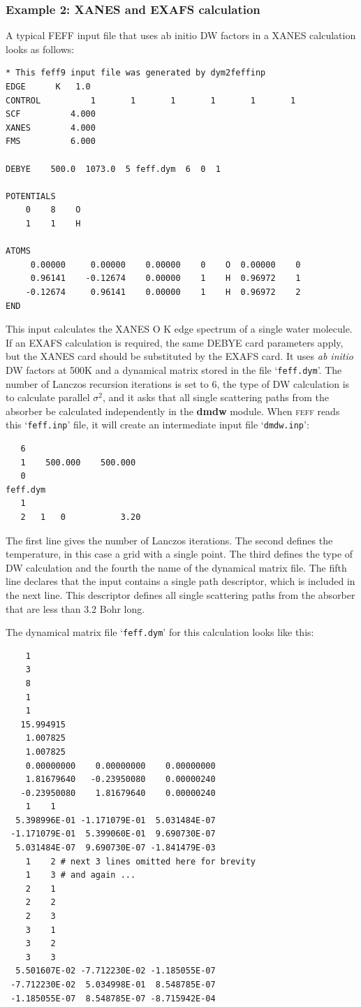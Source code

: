 \documentclass[11pt,oneside]{report} %
\newcommand{\program}[1]{\textsc{#1}}
\newcommand{\feff}{\program{feff}}
\newcommand{\file}[1]{`\texttt{#1}'}
\newcommand{\module}[1]{\textrm{\bf{#1}}}
\begin{document}
 
 \subsubsection{Example 2: XANES and EXAFS calculation}
 
  A typical FEFF input file that uses ab initio DW factors in a XANES
  calculation looks as follows:
  \begin{verbatim}
* This feff9 input file was generated by dym2feffinp
EDGE      K   1.0
CONTROL          1       1       1       1       1       1
SCF          4.000
XANES        4.000
FMS          6.000

DEBYE    500.0  1073.0  5 feff.dym  6  0  1

POTENTIALS
    0    8    O
    1    1    H

ATOMS
     0.00000     0.00000    0.00000    0    O  0.00000    0
     0.96141    -0.12674    0.00000    1    H  0.96972    1
    -0.12674     0.96141    0.00000    1    H  0.96972    2
END
\end{verbatim}

  This input calculates the XANES O K edge spectrum of a single water
  molecule. If an EXAFS calculation is required, the same DEBYE card parameters
  apply, but the XANES card should be substituted by the EXAFS card. It uses {\it ab
  initio} DW factors at 500K and a dynamical matrix stored in the file
  \file{feff.dym}. The number of Lanczos recursion iterations is set to 6, the type
  of DW calculation is to calculate parallel $\sigma^2$, and it asks that all single
  scattering paths from the absorber be calculated independently in the \module{dmdw}
  module.  When {\feff} reads this \file{feff.inp} file, it will create an intermediate input file \file{dmdw.inp}:
\begin{verbatim}
   6
   1    500.000    500.000
   0
feff.dym
   1
   2   1   0           3.20
\end{verbatim}  
  The first line gives the number of Lanczos iterations. The second
  defines the temperature, in this case a grid with a single point. The third
  defines the type of DW calculation and the fourth the name of the dynamical
  matrix file. The fifth line declares that the input contains a single path
  descriptor, which is included in the next line. This descriptor defines all
  single scattering paths from the absorber that are less than 3.2 Bohr long.

 The dynamical matrix file \file{feff.dym} for this calculation looks like this:
\begin{verbatim}
    1
    3
    8
    1
    1
   15.994915
    1.007825
    1.007825
    0.00000000    0.00000000    0.00000000
    1.81679640   -0.23950080    0.00000240
   -0.23950080    1.81679640    0.00000240
    1    1
  5.398996E-01 -1.171079E-01  5.031484E-07
 -1.171079E-01  5.399060E-01  9.690730E-07
  5.031484E-07  9.690730E-07 -1.841479E-03
    1    2 # next 3 lines omitted here for brevity
    1    3 # and again ...
    2    1
    2    2
    2    3
    3    1
    3    2
    3    3
  5.501607E-02 -7.712230E-02 -1.185055E-07
 -7.712230E-02  5.034998E-01  8.548785E-07
 -1.185055E-07  8.548785E-07 -8.715942E-04
\end{verbatim}
\end{document}
